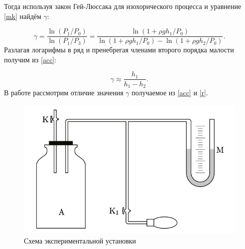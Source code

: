 \documentclass[a4paper, 12pt]{article}%
\begin{document}
	Тогда используя закон Гей-Люссака для изохорического процесса и уравнение \eqref{mk} найдём $\gamma$:
	
	\begin{equation}\label{acc}
		\gamma = \dfrac{\ln(P_1 / P_0)}{\ln (P_1 / P_3)}=\dfrac{\ln(1+\rho g h_1 / P_0)}{\ln(1+\rho g h_1 / P_0)-\ln(1+\rho g h_2 / P_0)}.
	\end{equation}
	\newpage
	Разлагая логарифмы в ряд и пренебрегая членами второго порядка малости получим из \eqref{acc}:
	
	\begin{equation}\label{r}
		\gamma \approx \dfrac{h_1}{h_1 - h_2}.
	\end{equation}
	В работе рассмотрим отличие значения $\gamma$ получаемое из \eqref{acc} и \eqref{r}.
	\begin{figure}[H]
		\centering
		\includegraphics[width=0.6\linewidth]{1}
		\caption{Схема экспериментальной установки}
		\label{fig:1}
	\end{figure}
\end{document}
